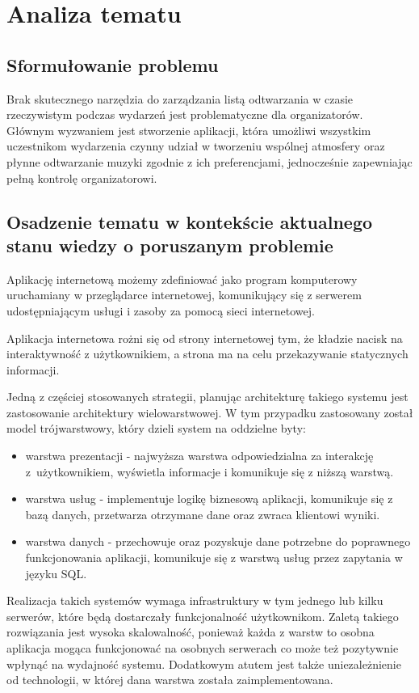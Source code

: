 \chapter{Analiza tematu}

\section{Sformułowanie problemu}
Brak skutecznego narzędzia do zarządzania listą odtwarzania w czasie rzeczywistym podczas wydarzeń jest problematyczne dla organizatorów. Głównym wyzwaniem jest stworzenie aplikacji, która umożliwi wszystkim uczestnikom wydarzenia czynny udział w tworzeniu wspólnej atmosfery oraz płynne odtwarzanie muzyki zgodnie z ich preferencjami, jednocześnie zapewniając pełną kontrolę organizatorowi.

\section{Osadzenie tematu w kontekście aktualnego stanu wiedzy o poruszanym problemie}

\begin{Definition}\label{def:1}
Aplikację internetową możemy zdefiniować jako program komputerowy uruchamiany w przeglądarce internetowej, komunikujący się z serwerem udostępniającym usługi i zasoby za pomocą sieci internetowej. \cite{bib:web_app_def}
\end{Definition}

Aplikacja internetowa rożni się od strony internetowej tym, że kładzie nacisk na interaktywność z użytkownikiem, a strona ma na celu przekazywanie statycznych informacji.

Jedną z częściej stosowanych strategii, planując architekturę takiego systemu jest zastosowanie architektury wielowarstwowej. W tym przypadku zastosowany został model trójwarstwowy, który dzieli system na oddzielne byty:
\begin{itemize}
\item warstwa prezentacji - najwyższa warstwa odpowiedzialna za interakcję z~użytkownikiem, wyświetla informacje i komunikuje się z niższą warstwą.
\item warstwa usług - implementuje logikę biznesową aplikacji, komunikuje się z bazą danych, przetwarza otrzymane dane oraz zwraca klientowi wyniki.
\item warstwa danych - przechowuje oraz pozyskuje dane potrzebne do poprawnego funkcjonowania aplikacji, komunikuje się z warstwą usług przez zapytania w języku SQL.
\end{itemize}
Realizacja takich systemów wymaga infrastruktury w tym jednego lub kilku serwerów, które będą dostarczały funkcjonalność użytkownikom. Zaletą takiego rozwiązania jest wysoka skalowalność, ponieważ każda z warstw to osobna aplikacja mogąca funkcjonować na osobnych serwerach co może też pozytywnie wpłynąć na wydajność systemu. Dodatkowym atutem jest także uniezależnienie od technologii, w której dana warstwa została zaimplementowana.

